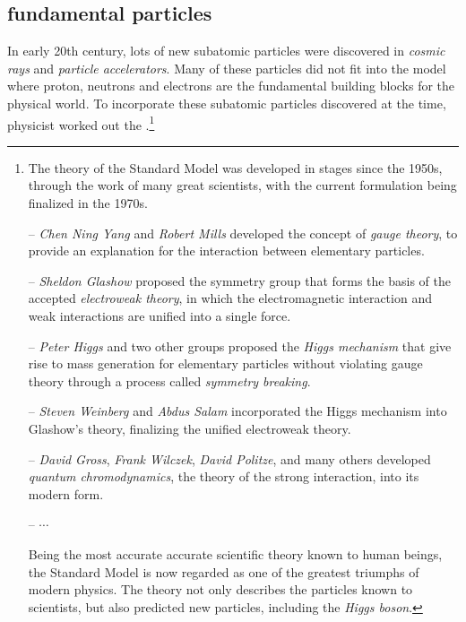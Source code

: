 \subsection{fundamental particles}

In early 20th century, lots of new subatomic particles were discovered in \emph{cosmic rays} and \emph{particle accelerators}. Many of these particles did not fit into the model where proton, neutrons and electrons are the fundamental building blocks for the physical world. To incorporate these subatomic particles discovered at the time, physicist worked out the .\footnote{The theory of the Standard Model was developed in stages since the 1950s, through the work of many great scientists, with the current formulation being finalized in the 1970s.
	\begin{compactitem}
		\item[--] \emph{Chen Ning Yang} and \emph{Robert Mills} developed the concept of \emph{gauge theory}, to provide an explanation for the interaction between elementary particles.
		
		\item[--] \emph{Sheldon Glashow} proposed the symmetry group that forms the basis of the accepted \emph{electroweak theory}, in which the electromagnetic interaction and weak interactions are unified into a single force.
		
		\item[--] \emph{Peter Higgs} and two other groups proposed the \emph{Higgs mechanism} that give rise to mass generation for elementary particles without violating gauge theory through a process called \emph{symmetry breaking}.
		
		\item[--] \emph{Steven Weinberg} and \emph{Abdus Salam} incorporated the Higgs mechanism into Glashow's theory, finalizing the unified electroweak theory.
		
		\item[--] \emph{David Gross}, \emph{Frank Wilczek}, \emph{David Politze}, and many others developed \emph{quantum chromodynamics}, the theory of the strong interaction, into its modern form.
		
		\item[--] $\cdots$
	\end{compactitem}

Being the most accurate accurate scientific theory known to human beings, the Standard Model is now regarded as one of the greatest triumphs of modern physics. The theory not only describes the particles known to scientists, but also predicted new particles, including the \emph{Higgs boson}. }


